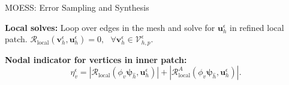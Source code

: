 \documentclass{beamer}
\newcounter{sectionframecount}
\begin{document}
\begin{frame}[t]{MOESS: Error Sampling and Synthesis}
\vspace{-12pt}

{
\textbf{Local solves:} Loop over edges in the mesh and solve for $\boldsymbol{u}_h^\epsilon$ in refined local patch.
$\mathcal{R}_{\text{local}}(\boldsymbol{v}_h^\epsilon,\boldsymbol{u}_h^\epsilon) = 0,~~~\forall \boldsymbol{v}_h^\epsilon \in \mathcal{V}_{h,p}^\epsilon$.
}


{
\vspace{4.3cm}
\textbf{Nodal indicator for vertices in inner patch:}
\begin{equation}
  \eta_v^\epsilon = |\mathcal{R}_\text{local}(\phi_v \boldsymbol{\psi}_{\hat{h}},\boldsymbol{u}_h^\epsilon)| + |\mathcal{R}_\text{local}^A(\phi_v\boldsymbol{\psi}_{\hat{h}},\boldsymbol{u}^\epsilon_h)|.
  \label{e:dwr_ind_base_local}
\end{equation}
}

\end{frame}

\end{document}
